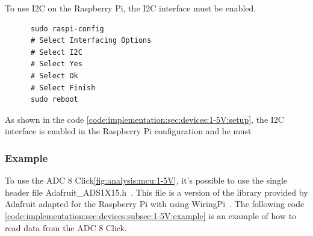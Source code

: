 To use I2C on the Raspberry Pi, the I2C interface must be enabled.

\begin{code}
  \label{code:implementation:sec:devices:1-5V:setup}
  \begin{verbatim}
      sudo raspi-config
      # Select Interfacing Options
      # Select I2C
      # Select Yes
      # Select Ok
      # Select Finish
      sudo reboot
  \end{verbatim}
\end{code}

As shown in the code \ref{code:implementation:sec:devices:1-5V:setup}, the I2C interface is enabled in the Raspberry Pi configuration and he must

\subsubsection{Example}
\label{ch:implementation:sec:devices:subsec:1-5V:example}

To use the ADC 8 Click\ref{fig:analysis:mcu:1-5V}, it's possible to use the single header file Adafruit\_ADS1X15.h~\cite{ads1x15}.
This file is a version of the library provided by Adafruit adapted for the Raspberry Pi with using WiringPi~\cite{WiringPi}.
The following code \ref{code:implementation:sec:devices:subsec:1-5V:example} is an example of how to read data from the ADC 8 Click.

